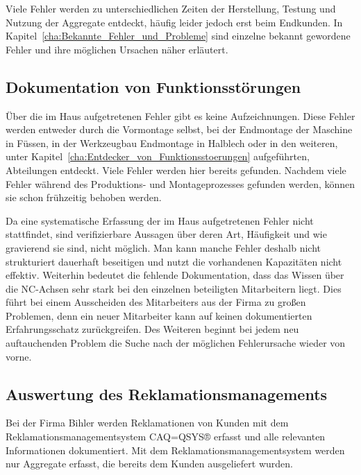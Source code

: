 Viele Fehler werden zu unterschiedlichen Zeiten der Herstellung, Testung und Nutzung der Aggregate entdeckt, häufig leider jedoch erst beim Endkunden. In Kapitel~\ref{cha:Bekannte_Fehler_und_Probleme} sind einzelne bekannt gewordene Fehler und ihre möglichen Ursachen näher erläutert.




\subsection{Dokumentation von Funktionsstörungen}\label{cha:Dokumentation_von_Funktionsstoerungen}

Über die im Haus aufgetretenen Fehler gibt es keine Aufzeichnungen. Diese Fehler werden entweder durch die Vormontage selbst, bei der Endmontage der Maschine in Füssen, in der Werkzeugbau Endmontage in Halblech oder in den weiteren, unter Kapitel~\ref{cha:Entdecker_von_Funktionsstoerungen} aufgeführten, Abteilungen entdeckt. Viele Fehler werden hier bereits gefunden. Nachdem viele Fehler während des Produktions- und Montageprozesses gefunden werden, können sie schon frühzeitig behoben werden.





Da eine systematische Erfassung der im Haus aufgetretenen Fehler nicht stattfindet, sind verifizierbare Aussagen über deren Art, Häufigkeit und wie gravierend sie sind, nicht möglich. Man kann manche Fehler deshalb nicht strukturiert dauerhaft beseitigen und nutzt die vorhandenen Kapazitäten nicht effektiv. Weiterhin bedeutet die fehlende Dokumentation, dass das Wissen über die NC-Achsen sehr stark bei den einzelnen beteiligten Mitarbeitern liegt. Dies führt bei einem Ausscheiden des Mitarbeiters aus der Firma zu großen Problemen, denn ein neuer Mitarbeiter kann auf keinen dokumentierten Erfahrungsschatz zurückgreifen. Des Weiteren beginnt bei jedem neu auftauchenden Problem die Suche nach der möglichen Fehlerursache wieder von vorne.



\subsection{Auswertung des Reklamationsmanagements}\label{cha:Auswertung_des_Reklamationsmanagements}




Bei der Firma Bihler werden Reklamationen von Kunden mit dem Reklamationsmanagementsystem CAQ=QSYS®  erfasst und alle relevanten Informationen dokumentiert. Mit dem Reklamationsmanagementsystem werden nur Aggregate erfasst, die bereits dem Kunden ausgeliefert wurden.



